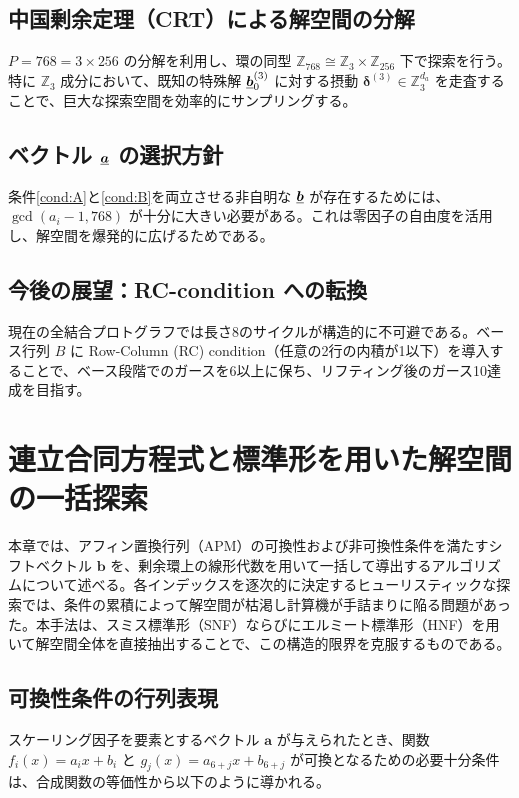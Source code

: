 \documentclass[a4paper,11pt,dvipdfmx]{jsarticle}
\theoremstyle{definition}
\begin{document}
\subsection{中国剰余定理（CRT）による解空間の分解}
$P=768 = 3 \times 256$ の分解を利用し、環の同型 $\mathbb{Z}_{768} \cong \mathbb{Z}_3 \times \mathbb{Z}_{256}$ 下で探索を行う。
特に $\mathbb{Z}_3$ 成分において、既知の特殊解 $\underline{\bm{b}}_0^{(3)}$ に対する摂動 $\bm{\delta}^{(3)} \in \mathbb{Z}_3^{d_a}$ を走査することで、巨大な探索空間を効率的にサンプリングする。

\subsection{ベクトル $\underline{\bm{a}}$ の選択方針}
条件\ref{cond:A}と\ref{cond:B}を両立させる非自明な $\underline{\bm{b}}$ が存在するためには、$\gcd(a_i-1, 768)$ が十分に大きい必要がある。これは零因子の自由度を活用し、解空間を爆発的に広げるためである。

\subsection{今後の展望：RC-condition への転換}
現在の全結合プロトグラフでは長さ8のサイクルが構造的に不可避である。ベース行列 $B$ に Row-Column (RC) condition（任意の2行の内積が1以下）を導入することで、ベース段階でのガースを6以上に保ち、リフティング後のガース10達成を目指す。

\section{連立合同方程式と標準形を用いた解空間の一括探索}

本章では、アフィン置換行列（APM）の可換性および非可換性条件を満たすシフトベクトル $\boldsymbol{b}$ を、剰余環上の線形代数を用いて一括して導出するアルゴリズムについて述べる。各インデックスを逐次的に決定するヒューリスティックな探索では、条件の累積によって解空間が枯渇し計算機が手詰まりに陥る問題があった。本手法は、スミス標準形（SNF）ならびにエルミート標準形（HNF）を用いて解空間全体を直接抽出することで、この構造的限界を克服するものである。

\subsection{可換性条件の行列表現}
スケーリング因子を要素とするベクトル $\boldsymbol{a}$ が与えられたとき、関数 $f_i(x) = a_i x + b_i$ と $g_j(x) = a_{6+j} x + b_{6+j}$ が可換となるための必要十分条件は、合成関数の等価性から以下のように導かれる。
\end{document}
